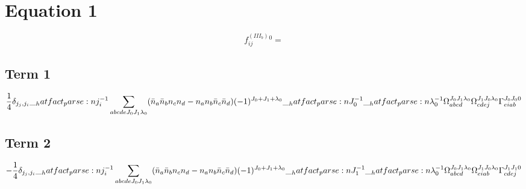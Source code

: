 \documentclass{scrartcl}
\begin{document}
\section{Equation 1}
\begin{dmath*}
f^{(III_b)}_{i j}^{0} = 
\end{dmath*}
\subsection{Term 1}
\begin{dmath*}
\frac{1}{4} \* \delta_{{j}_{j},{j}_{i}} \* \hatfact{{j}_{i}^{-1}} \* \sum_{a b c d e {J}_{0} {J}_{1} {{\lambda}}_{0}} \* (\bar{n}_{a} \* \bar{n}_{b} \* n_{c} \* n_{d} -n_{a} \* n_{b} \* \bar{n}_{c} \* \bar{n}_{d}) \* (-1)^{{J}_{0}+{J}_{1}+{{\lambda}}_{0}} \* \hatfact{{J}_{0}^{-1}} \* \hatfact{{{\lambda}}_{0}^{-1}} \* \Omega_{a b c d}^{{J}_{0} {J}_{1} {{\lambda}}_{0}} \* \Omega_{c d e j}^{{J}_{1} {J}_{0} {{\lambda}}_{0}} \* \Gamma_{e i a b}^{{J}_{0} {J}_{0} 0}
\end{dmath*}
\subsection{Term 2}
\begin{dmath*}
-\frac{1}{4} \* \delta_{{j}_{j},{j}_{i}} \* \hatfact{{j}_{i}^{-1}} \* \sum_{a b c d e {J}_{0} {J}_{1} {{\lambda}}_{0}} \* (\bar{n}_{a} \* \bar{n}_{b} \* n_{c} \* n_{d} -n_{a} \* n_{b} \* \bar{n}_{c} \* \bar{n}_{d}) \* (-1)^{{J}_{0}+{J}_{1}+{{\lambda}}_{0}} \* \hatfact{{J}_{1}^{-1}} \* \hatfact{{{\lambda}}_{0}^{-1}} \* \Omega_{a b c d}^{{J}_{0} {J}_{1} {{\lambda}}_{0}} \* \Omega_{e i a b}^{{J}_{1} {J}_{0} {{\lambda}}_{0}} \* \Gamma_{c d e j}^{{J}_{1} {J}_{1} 0}
\end{dmath*}
\end{document}
